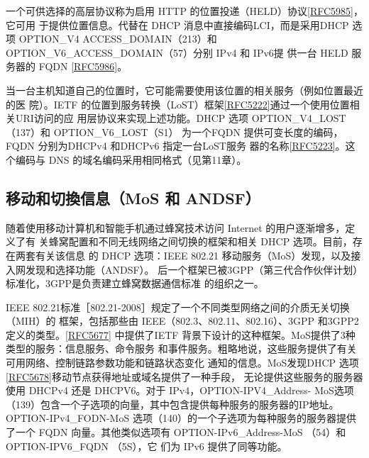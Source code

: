 一个可供选择的高层协议称为启用 HTTP
的位置投递（HELD）协议\href{https://www.rfc-editor.org/rfc/rfc5985}{\href{https://www.rfc-editor.org/rfc/rfc5985}{[RFC5985]}}，它可用
于提供位置信息。代替在 DHCP 消息中直接编码LCI，而是采用DHCP 选项 OPTION\_V4
ACCESS\_DOMAIN（213）和 OPTION\_V6\_ACCESS\_DOMAIN（57）分别 IPv4 和 IPv6提
供一台 HELD 服务器的 FQDN
\href{https://www.rfc-editor.org/rfc/rfc5986}{\href{https://www.rfc-editor.org/rfc/rfc5986}{[RFC5986]}}。

当一台主机知道自己的位置时，它可能需要使用该位置的相关服务（例如位置最近的医
院）。IETF
的位置到服务转换（LoST）框架\href{https://www.rfc-editor.org/rfc/rfc5222}{\href{https://www.rfc-editor.org/rfc/rfc5222}{[RFC5222]}}通过一个使用位置相关URI访问的应
用层协议来实现上述功能。DHCP 选项 OPTION\_V4\_LOST （137）和 OPTION\_V6\_LOST（S1）
为一个FQDN 提供可变长度的编码，FQDN 分别为DHCPv4 和DHCPv6 指定一台LoST服务
器的名称\href{https://www.rfc-editor.org/rfc/rfc5223}{\href{https://www.rfc-editor.org/rfc/rfc5223}{[RFC5223]}}。这个编码与
DNS 的域名编码采用相同格式（见第11章）。

\subsection{移动和切換信息（MoS 和 ANDSF）}
随着使用移动计算机和智能手机通过蜂窝技术访问 Internet 的用户逐渐增多，定义了有
关蜂窝配置和不同无线网络之间切换的框架和相关 DHCP 选项。目前，存在两套有关该信息
的 DHCP 选项：IEEE 802.21 移动服务（MoS）发现，以及接入网发现和选择功能（ANDSF）。
后一个框架已被3GPP（第三代合作伙伴计划）标准化，3GPP是负责建立蜂窝数据通信标准
的组织之一。

IEEE 802.21标准［802.21-2008］规定了一个不同类型网络之间的介质无关切换（MIH）的
框架，包括那些由 IEEE（802.3、802.11、802.16）、3GPP
和3GPP2定义的类型。\href{https://www.rfc-editor.org/rfc/rfc5677}{\href{https://www.rfc-editor.org/rfc/rfc5677}{[RFC5677]}}
中提供了IETF 背景下设计的这种框架。MoS提供了3种类型的服务：信息服务、命令服务
和事件服务。粗略地说，这些服务提供了有关可用网络、控制链路参数功能和链路状态变化
通知的信息。MoS发现DHCP
选项\href{https://www.rfc-editor.org/rfc/rfc5678}{\href{https://www.rfc-editor.org/rfc/rfc5678}{[RFC5678]}}移动节点获得地址或域名提供了一种手段，
无论提供这些服务的服务器使用 DHCPv4 还是 DHCPV6。对于 IPv4，OPTION-IPV4\_Address-
MoS选项（139）包含一个子选项的向量，其中包含提供每种服务的服务器的IP地址。
OPTION-IPv4\_FODN-MoS 选项（140）的一个子选项为每种服务的服务器提供了一个 FQDN
向量。其他类似选项有 OPTION-IPv6\_Address-MoS （54）和 OPTION-IPV6\_FQDN （5S），它
们为 IPv6 提供了同等功能。

